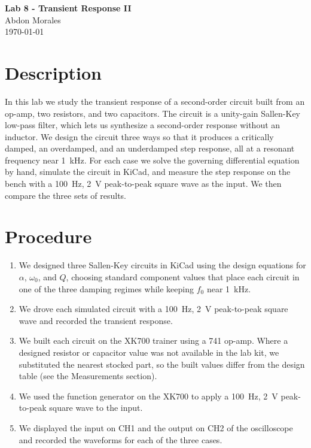 \documentclass[11pt]{article}
\begin{document}
\begin{center}
    {\LARGE\bfseries Lab 8 - Transient Response II}\\[0.8em]
    {\large Abdon Morales}\\[0.3em]
    {\large \today}
\end{center}
\vspace{1em}

\section*{Description}

In this lab we study the transient response of a second-order circuit built from
an op-amp, two resistors, and two capacitors. The circuit is a unity-gain
Sallen-Key low-pass filter, which lets us synthesize a second-order response
without an inductor. We design the circuit three ways so that it produces a
critically damped, an overdamped, and an underdamped step response, all at a
resonant frequency near \SI{1}{\kilo\hertz}. For each case we solve the governing
differential equation by hand, simulate the circuit in KiCad, and measure the
step response on the bench with a \SI{100}{\hertz}, \SI{2}{\volt} peak-to-peak
square wave as the input. We then compare the three sets of results.

\section*{Procedure}

\begin{enumerate}
    \item We designed three Sallen-Key circuits in KiCad using the design
    equations for $\alpha$, $\omega_0$, and $Q$, choosing standard component
    values that place each circuit in one of the three damping regimes while
    keeping $f_0$ near \SI{1}{\kilo\hertz}.
    \item We drove each simulated circuit with a \SI{100}{\hertz},
    \SI{2}{\volt} peak-to-peak square wave and recorded the transient response.
    \item We built each circuit on the XK700 trainer using a 741 op-amp. Where a
    designed resistor or capacitor value was not available in the lab kit, we
    substituted the nearest stocked part, so the built values differ from the
    design table (see the Measurements section).
    \item We used the function generator on the XK700 to apply a \SI{100}{\hertz},
    \SI{2}{\volt} peak-to-peak square wave to the input.
    \item We displayed the input on CH1 and the output on CH2 of the oscilloscope
    and recorded the waveforms for each of the three cases.
\end{enumerate}
\end{document}
